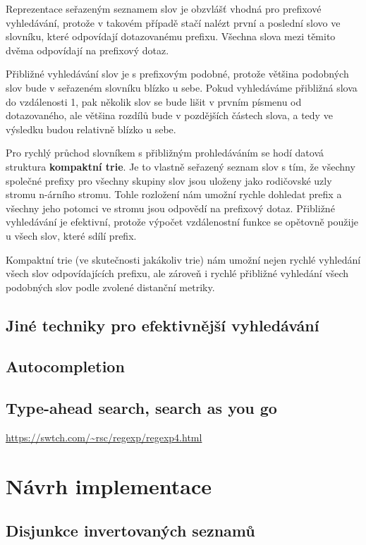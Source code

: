 \documentclass[11pt]{article}
\begin{document}
Reprezentace seřazeným seznamem slov je obzvlášť vhodná pro prefixové
vyhledávání, protože v takovém případě stačí nalézt první a poslední slovo ve
slovníku, které odpovídají dotazovanému prefixu. Všechna slova mezi těmito
dvěma odpovídají na prefixový dotaz.

Přibližné vyhledávání slov je s prefixovým podobné, protože většina podobných
slov bude v seřazeném slovníku blízko u sebe. Pokud vyhledáváme přibližná slova
do vzdálenosti 1, pak několik slov se bude lišit v prvním písmenu od
dotazovaného, ale většina rozdílů bude v pozdějších částech slova, a tedy ve
výsledku budou relativně blízko u sebe.

Pro rychlý průchod slovníkem s přibližným prohledáváním se hodí datová
struktura \textbf{kompaktní trie}. Je to vlastně seřazený seznam slov s tím, že
všechny společné prefixy pro všechny skupiny slov jsou uloženy jako rodičovské
uzly stromu n-árního stromu. Tohle rozložení nám umožní rychle dohledat prefix
a všechny jeho potomci ve stromu jsou odpovědí na prefixový dotaz. Přibližné
vyhledávání je efektivní, protože výpočet vzdálenostní funkce se opětovně
použije u všech slov, které sdílí prefix.

Kompaktní trie (ve skutečnosti jakákoliv trie) nám umožní nejen rychlé
vyhledání všech slov odpovídajících prefixu, ale zároveň i rychlé přibližné
vyhledání všech podobných slov podle zvolené distanční metriky.


\subsection{Jiné techniky pro efektivnější vyhledávání}
\subsection{Autocompletion}

\subsection{Type-ahead search, search as you go}

\url{https://swtch.com/~rsc/regexp/regexp4.html}

\section{Návrh implementace}
\subsection{Disjunkce invertovaných seznamů}
\end{document}
